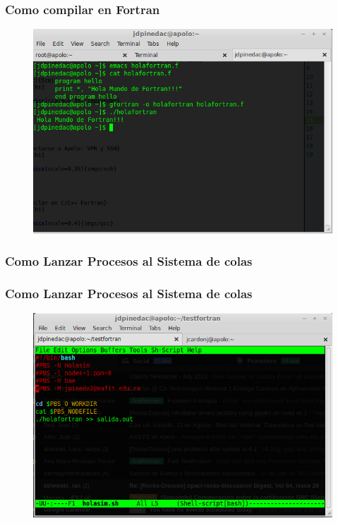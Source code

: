 \begin{frame}
\frametitle{Como compilar en Fortran}
      \begin{figure}[ht]
        \centering
        \includegraphics[scale=0.4]{imgs/fortran}
      \end{figure}
\end{frame}

\begin{frame}
\frametitle{Como Lanzar Procesos al Sistema de colas}
      \begin{figure}[ht]
        \centering
      \end{figure}
\end{frame}

\begin{frame}
\frametitle{Como Lanzar Procesos al Sistema de colas}
      \begin{figure}[ht]
        \centering
        \includegraphics[scale=0.4]{imgs/queue}
      \end{figure}
\end{frame}

